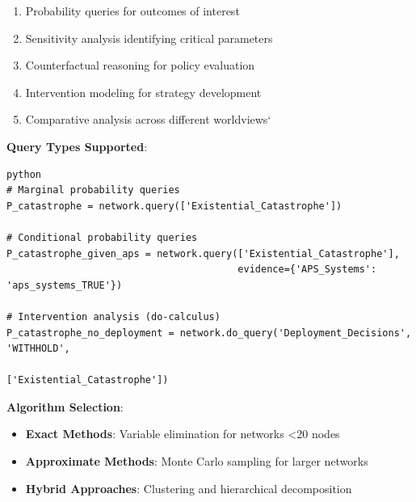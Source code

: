\documentclass[
  11pt,
  letterpaper,
]{book}
\providecommand{\tightlist}{%
  \setlength{\itemsep}{0pt}\setlength{\parskip}{0pt}}
\begin{document}
\begin{enumerate}
\def\labelenumi{\arabic{enumi}.}
\tightlist
\item
  Probability queries for outcomes of interest
\item
  Sensitivity analysis identifying critical parameters
\item
  Counterfactual reasoning for policy evaluation
\item
  Intervention modeling for strategy development
\item
  Comparative analysis across different worldviews`
\end{enumerate}

\textbf{Query Types Supported}:

\begin{verbatim}
python
# Marginal probability queries
P_catastrophe = network.query(['Existential_Catastrophe'])

# Conditional probability queries  
P_catastrophe_given_aps = network.query(['Existential_Catastrophe'], 
                                        evidence={'APS_Systems': 'aps_systems_TRUE'})

# Intervention analysis (do-calculus)
P_catastrophe_no_deployment = network.do_query('Deployment_Decisions', 'WITHHOLD',
                                               ['Existential_Catastrophe'])
\end{verbatim}

\textbf{Algorithm Selection}:

\begin{itemize}
\tightlist
\item
  \textbf{Exact Methods}: Variable elimination for networks \textless20
  nodes
\item
  \textbf{Approximate Methods}: Monte Carlo sampling for larger networks
\item
  \textbf{Hybrid Approaches}: Clustering and hierarchical decomposition
\end{itemize}
\end{document}
